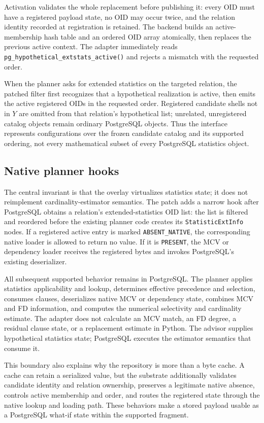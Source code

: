 Activation validates the whole replacement before publishing it: every OID
must have a registered payload state, no OID may occur twice, and the
relation identity recorded at registration is retained.  The backend builds
an active-membership hash table and an ordered OID array atomically, then
replaces the previous active context.  The adapter immediately reads
\texttt{pg\_hypothetical\_extstats\_active()} and rejects a mismatch with
the requested order.

When the planner asks for extended statistics on the targeted relation, the
patched filter first recognizes that a hypothetical realization is active,
then emits the active registered OIDs in the requested order.  Registered
candidate shells not in $Y$ are omitted from that relation's hypothetical
list; unrelated, unregistered catalog objects remain ordinary PostgreSQL
objects.  Thus the interface represents configurations over the frozen
candidate catalog and its supported ordering, not every mathematical subset
of every PostgreSQL statistics object.

\subsection{Native planner hooks}

The central invariant is that the overlay virtualizes statistics state; it
does not reimplement cardinality-estimator semantics.  The patch adds a
narrow hook after PostgreSQL obtains a relation's extended-statistics OID list:
the list is filtered and reordered before the existing planner code creates
its \texttt{StatisticExtInfo} nodes.  If a registered active entry is marked
\texttt{ABSENT\_NATIVE}, the corresponding native loader is allowed to return
no value.  If it is \texttt{PRESENT}, the MCV or dependency loader receives the
registered bytes and invokes PostgreSQL's existing deserializer.

All subsequent supported behavior remains in PostgreSQL.  The planner applies
statistics applicability and lookup, determines effective precedence and
selection, consumes clauses, deserializes native MCV or dependency state,
combines MCV and FD information, and computes the numerical selectivity and
cardinality estimate.  The adapter does not calculate an MCV match, an FD
degree, a residual clause state, or a replacement estimate in Python.  The
advisor supplies hypothetical statistics state; PostgreSQL executes the
estimator semantics that consume it.

This boundary also explains why the repository is more than a byte cache.  A
cache can retain a serialized value, but the substrate additionally validates
candidate identity and relation ownership, preserves a legitimate native
absence, controls active membership and order, and routes the registered state
through the native lookup and loading path.  These behaviors make a stored
payload usable as a PostgreSQL what-if state within the supported fragment.

